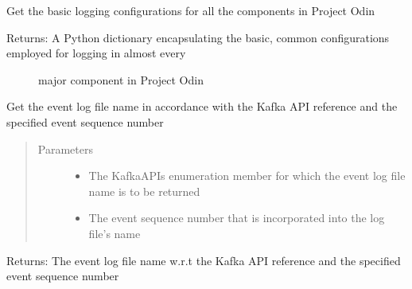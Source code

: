 \documentclass[letterpaper,10pt,english]{sphinxmanual}
\begin{document}

\begin{fulllineitems}
\label{\detokenize{Forge:Forge.get_basic_logging}}
\sphinxAtStartPar
Get the basic logging configurations for all the components in Project Odin
\begin{description}
\item[{Returns: A Python dictionary encapsulating the basic, common configurations employed for logging in almost every}] \leavevmode
\sphinxAtStartPar
major component in Project Odin

\end{description}

\end{fulllineitems}


\begin{fulllineitems}
\label{\detokenize{Forge:Forge.get_file_name}}
\sphinxAtStartPar
Get the event log file name in accordance with the Kafka API reference and the specified event sequence number
\begin{quote}\begin{description}
\item[{Parameters}] \leavevmode\begin{itemize}
\item {} 
\sphinxAtStartPar
{} \textendash{} The KafkaAPIs enumeration member for which the event log file name is to be returned

\item {} 
\sphinxAtStartPar
{} \textendash{} The event sequence number that is incorporated into the log file’s name

\end{itemize}

\end{description}\end{quote}

\sphinxAtStartPar
Returns: The event log file name w.r.t the Kafka API reference and the specified event sequence number

\end{fulllineitems}
\end{document}
